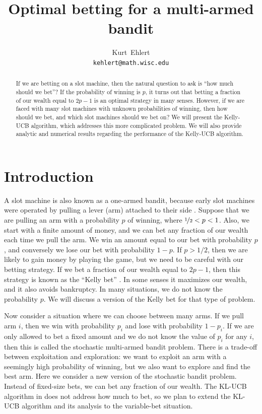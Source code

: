 \documentclass[letterpaper]{article}
\title{Optimal betting for a multi-armed bandit}
\author{
  Kurt~Ehlert\\
  \texttt{kehlert@math.wisc.edu}\\
}
\numberwithin{equation}{section}
\theoremstyle{plain}
\begin{document}

\maketitle

\begin{abstract}
If we are betting on a slot machine, then the natural question to ask is ``how much should we bet''? If the probability of winning is $p$, it turns out that betting a fraction of our wealth equal to $2p-1$ is an optimal strategy in many senses. However, if we are faced with many slot machines with unknown probabilities of winning, then how should we bet, and which slot machines should we bet on? We will present the Kelly-UCB algorithm, which addresses this more complicated problem. We will also provide analytic and numerical results regarding the performance of the Kelly-UCB algorithm.
\end{abstract}

\section{Introduction}
A slot machine is also known as a one-armed bandit, because early slot machines were operated by pulling a lever (arm) attached to their side \citep{onearmedbanditdict}. Suppose that we are pulling an arm with a probability $p$ of winning, where $\nicefrac{1}{2} < p < 1$. Also, we start with a finite amount of money, and we can bet any fraction of our wealth each time we pull the arm. We win an amount equal to our bet with probability $p$, and conversely we lose our bet with probability $1-p$. If $p > 1/2$, then we are likely to gain money by playing the game, but we need to be careful with our betting strategy. If we bet a fraction of our wealth equal to $2p-1$, then this strategy is known as the ``Kelly bet'' \citep{kelly1956new,thorp2006kelly}. In some senses it maximizes our wealth, and it also avoids bankruptcy. In many situations, we do not know the probability $p$. We will discuss a version of the Kelly bet for that type of problem.

Now consider a situation where we can choose between many arms. If we pull arm $i$, then we win with probability $p_i$ and lose with probability $1-p_i$. If we are only allowed to bet a fixed amount and we do not know the value of $p_i$ for any $i$, then this is called the stochastic multi-armed bandit problem. There is a trade-off between exploitation and exploration: we want to exploit an arm with a seemingly high probability of winning, but we also want to explore and find the best arm. Here we consider a new version of the stochastic bandit problem. Instead of fixed-size bets, we can bet any fraction of our wealth. The KL-UCB algorithm in \cite{cappe2013kullback} does not address how much to bet, so we plan to extend the KL-UCB algorithm and its analysis to the variable-bet situation.
\end{document}

